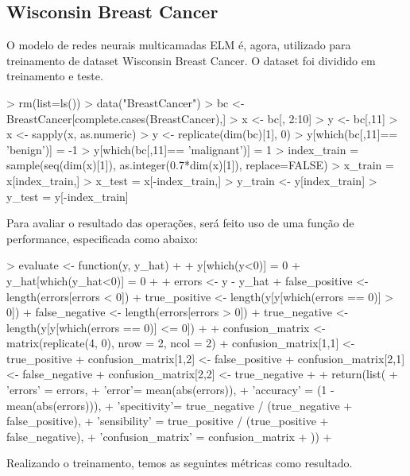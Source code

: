 \documentclass{article}
\begin{document}
\subsection{Wisconsin Breast Cancer}

O modelo de redes neurais multicamadas ELM é, agora, utilizado para treinamento de dataset Wisconsin Breast Cancer. O dataset foi dividido em treinamento e teste.

\begin{Schunk}
\begin{Sinput}
> rm(list=ls())
> data("BreastCancer")
> bc <- BreastCancer[complete.cases(BreastCancer),]
> x <- bc[, 2:10]
> y <- bc[,11]
> x <- sapply(x, as.numeric)
> y <- replicate(dim(bc)[1], 0)
> y[which(bc[,11]== 'benign')] = -1
> y[which(bc[,11]== 'malignant')] = 1
> index_train = sample(seq(dim(x)[1]), as.integer(0.7*dim(x)[1]), replace=FALSE)
> x_train = x[index_train,]
> x_test = x[-index_train,]
> y_train <- y[index_train]
> y_test = y[-index_train]
\end{Sinput}
\end{Schunk}

Para avaliar o resultado das operações, será feito uso de uma função de performance, especificada como abaixo:

\begin{Schunk}
\begin{Sinput}
> evaluate <- function(y, y_hat) {
+ 
+     y[which(y<0)] = 0
+     y_hat[which(y_hat<0)] = 0
+ 
+     errors <- y - y_hat
+     false_positive <- length(errors[errors < 0])
+     true_positive <- length(y[y[which(errors == 0)] > 0])
+     false_negative <- length(errors[errors > 0])
+     true_negative <- length(y[y[which(errors == 0)] <= 0])
+ 
+     confusion_matrix <- matrix(replicate(4, 0), nrow = 2, ncol = 2)
+     confusion_matrix[1,1] <- true_positive
+     confusion_matrix[1,2] <- false_positive
+     confusion_matrix[2,1] <- false_negative
+     confusion_matrix[2,2] <- true_negative
+ 
+     return(list(
+         'errors' = errors,
+         'error'= mean(abs(errors)),
+         'accuracy' = (1 - mean(abs(errors))),
+         'specitivity'= true_negative / (true_negative + false_positive),
+         'sensibility' = true_positive / (true_positive + false_negative),
+         'confusion_matrix' = confusion_matrix
+     ))
+ }
\end{Sinput}
\end{Schunk}


Realizando o treinamento, temos as seguintes métricas como resultado.
\end{document}
